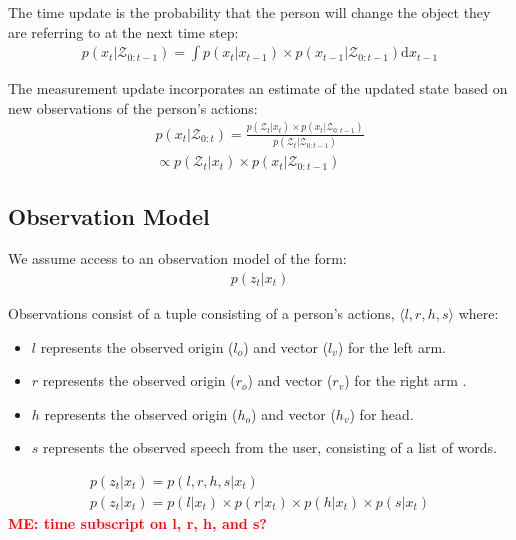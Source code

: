 \documentclass[letterpaper, 10 pt, conference]{ieeeconf}
\newcommand{\menote}[1]{\textcolor{Red}{\textbf{ME: #1}}}
\begin{document}
The time update is the probability that the person will change the
object they are referring to at the next time step:
\begin{align}
p(x_t | \mathcal{Z}_{0:t-1}) = \int p(x_t|x_{t-1})\times p(x_{t-1} | \mathcal{Z}_{0:t-1}) \text{d}x_{t-1}
\end{align}

The measurement update incorporates an estimate of the updated state
based on new observations of the person's actions: 
\begin{align}
p(x_t | \mathcal{Z}_{0:t}) = \frac{p(\mathcal{Z}_t | x_t) \times p(x_t | \mathcal{Z}_{0:t-1})}{p(\mathcal{Z}_t | \mathcal{Z}_{0:t-1})} \\\propto p(\mathcal{Z}_t | x_t) \times p(x_t | \mathcal{Z}_{0:t-1})
\end{align}





\subsection{Observation Model}

We assume access to an observation model of the form:
\begin{align}
p(z_t | x_t)
\end{align}

Observations consist of a tuple consisting of a person's actions,
$\langle l, r, h, s\rangle $ where:
\begin{itemize}
	\item $l$ represents the observed origin ($l_o$) and vector ($l_v$) for the left arm.
	\item $r$ represents the observed origin  ($r_o$) and vector ($r_v$)  for the right arm .
	\item $h$ represents the observed origin  ($h_o$) and vector ($h_v$)  for head.
	\item $s$ represents the observed speech from the user, consisting of a list of words.
	\end{itemize}

\begin{align}
p(z_t | x_t) = p(l, r, h, s | x_t)\\
p(z_t | x_t) = p(l | x_t) \times p(r | x_t) \times p(h | x_t) \times p(s | x_t)
\end{align}
\menote{time subscript on l, r, h, and s?}
\end{document}
